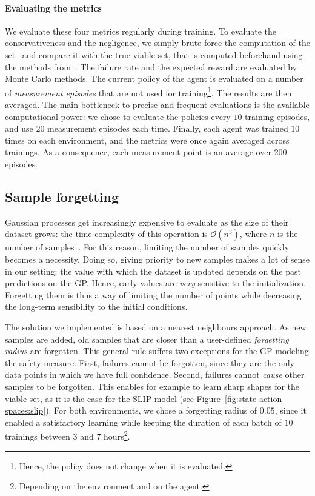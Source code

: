 \paragraph{Evaluating the metrics} We evaluate these four metrics regularly during training. To evaluate the conservativeness and the negligence, we simply brute-force the computation of the set \Qcaut~and compare it with the true viable set, that is computed beforehand using the methods from~\cite{heim2019beyond}. The failure rate and the expected reward are evaluated by Monte Carlo methods. The current policy of the agent is evaluated on a number of\emph{ measurement episodes} that are not used for training\footnote{Hence, the policy does not change when it is evaluated.}. The results are then averaged. The main bottleneck to precise and frequent evaluations is the available computational power: we chose to evaluate the policies every $10$ training episodes, and use $20$ measurement episodes each time. Finally, each agent was trained $10$ times on each environment, and the metrics were once again averaged across trainings. As a consequence, each measurement point is an average over $200$ episodes.

\subsection{Sample forgetting} \label{sec:sample forgetting}
Gaussian processes get increasingly expensive to evaluate as the size of their dataset grows: the time-complexity of this operation is $\mathcal{O}(n^3)$, where $n$ is the number of samples~\cite{williams2006gaussian}. For this reason, limiting the number of samples quickly becomes a necessity. Doing so, giving priority to new samples makes a lot of sense in our setting: the value with which the dataset is updated depends on the past predictions on the GP. Hence, early values are\emph{ very} sensitive to the initialization. Forgetting them is thus a way of limiting the number of points while decreasing the long-term sensibility to the initial conditions.\par
The solution we implemented is based on a nearest neighbours approach. As new samples are added, old samples that are closer than a user-defined\emph{ forgetting radius} are forgotten. This general rule suffers two exceptions for the GP modeling the safety measure. First, failures cannot be forgotten, since they are the only data points in which we have full confidence. Second, failures cannot\emph{ cause} other samples to be forgotten. This enables for example to learn sharp shapes for the viable set, as it is the case for the SLIP model (see Figure~\ref{fig:state action spaces:slip}). For both environments, we chose a forgetting radius of $0.05$, since it enabled a satisfactory learning while keeping the duration of each batch of $10$ trainings between $3$ and $7$ hours\footnote{Depending on the environment and on the agent.}.

